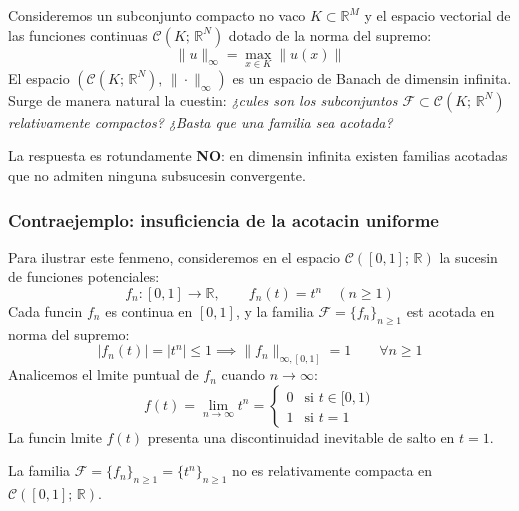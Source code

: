 Consideremos un subconjunto compacto no vaco $K \subset \mathbb{R}^M$ y el espacio vectorial de las funciones continuas $\mathcal{C}(K; \, \mathbb{R}^N)$ dotado de la norma del supremo:
\[
    \|u\|_\infty = \max_{x \in K} \|u(x)\|
\]
El espacio $(\mathcal{C}(K; \, \mathbb{R}^N), \, \|\cdot\|_\infty)$ es un espacio de Banach de dimensin infinita. Surge de manera natural la cuestin: \textit{¿cules son los subconjuntos $\mathcal{F} \subset \mathcal{C}(K; \, \mathbb{R}^N)$ relativamente compactos? ¿Basta que una familia sea acotada?}

La respuesta es rotundamente \textbf{NO}: en dimensin infinita existen familias acotadas que no admiten ninguna subsucesin convergente.

\subsubsection{Contraejemplo: insuficiencia de la acotacin uniforme}

Para ilustrar este fenmeno, consideremos en el espacio $\mathcal{C}([0, 1]; \, \mathbb{R})$ la sucesin de funciones potenciales:
\[
    f_n: [0, 1] \to \mathbb{R}, \qquad f_n(t) = t^n \quad (n \geq 1)
\]
Cada funcin $f_n$ es continua en $[0, 1]$, y la familia $\mathcal{F} = \{f_n\}_{n \geq 1}$ est acotada en norma del supremo:
\[
    |f_n(t)| = |t^n| \leq 1 \implies \|f_n\|_{\infty, [0, 1]} = 1 \qquad \forall n \geq 1
\]
Analicemos el lmite puntual de $f_n$ cuando $n \to \infty$:
\[
    f(t) = \lim_{n \to \infty} t^n = \begin{cases}
        0 & \text{si } t \in [0, 1) \\
        1 & \text{si } t = 1
    \end{cases}
\]
La funcin lmite $f(t)$ presenta una discontinuidad inevitable de salto en $t = 1$.

\begin{proposicin}
    La familia $\mathcal{F} = \{f_n\}_{n \geq 1} = \{t^n\}_{n \geq 1}$ no es relativamente compacta en $\mathcal{C}([0, 1]; \, \mathbb{R})$.
\end{proposicin}

